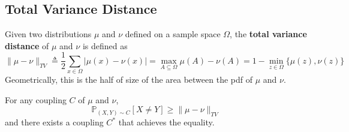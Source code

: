     \subsection{Total Variance Distance}
        \begin{definition}
            Given two distributions $\mu$ and $\nu$ defined on a sample space $\Omega$, the \textbf{total variance distance} of $\mu$ and $\nu$ is defined as
            \[ \|\mu - \nu \|_{TV} \triangleq \frac{1}{2}\sum_{x\in\Omega}|\mu(x)-\nu(x)| = \max_{A\subseteq\Omega} \mu(A)-\nu(A) = 1-\min_{z\in\Omega}\{ \mu(z), \nu(z) \} \]
            Geometrically, this is the half of size of the area between the pdf of $\mu$ and $\nu$.
        \end{definition}
        \begin{lemma}\label{CouplingLemma}
            For any coupling $C$ of $\mu$ and $\nu$,
            \[ \mathbb{P}_{(X,Y)\sim C}[X \neq Y] \ge \|\mu - \nu \|_{TV} \]
            and there exists a coupling $C^{*}$ that achieves the equality.
        \end{lemma}
